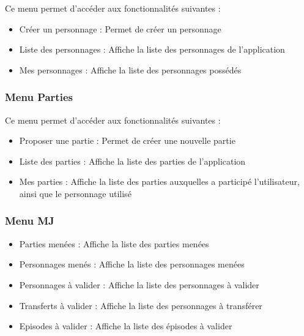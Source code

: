 \documentclass[a4paper, 11pt, titlepage]{article}
\begin{document}
Ce menu permet d'accéder aux fonctionnalités suivantes :

\begin{itemize}
\item
Créer un personnage : Permet de créer un personnage

\item
Liste des personnages : Affiche la liste des personnages de l'application

\item
Mes personnages : Affiche la liste des personnages possédés

\end{itemize}


\subsubsection {Menu Parties}

Ce menu permet d'accéder aux fonctionnalités suivantes :

\begin{itemize}
\item
Proposer une partie : Permet de créer une nouvelle partie

\item
Liste des parties : Affiche la liste des parties de l'application

\item
Mes parties : Affiche la liste des parties auxquelles a participé l'utilisateur, ainsi que le personnage utilisé

\end{itemize}


\subsubsection {Menu MJ}

\begin{itemize}
\item
Parties menées : Affiche la liste des parties menées

\item
Personnages menés : Affiche la liste des personnages menées

\item
Personnages à valider : Affiche la liste des personnages à valider

\item
Transferts à valider : Affiche la liste des personnages à transférer

\item
Episodes à valider : Affiche la liste des épisodes à valider

\end{itemize}
\end{document}

